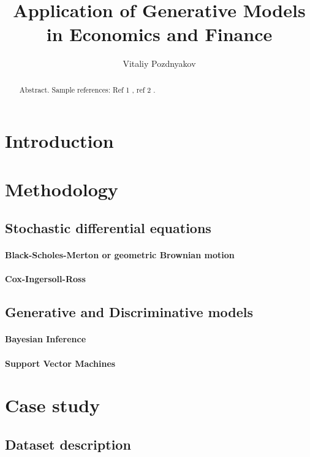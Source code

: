 \documentclass{article}
\title{Application of Generative Models \\ in Economics and Finance}
\author{Vitaliy Pozdnyakov}
\date{}
\begin{document}
\maketitle

\begin{abstract}
    Abstract. Sample references: Ref 1 \cite{renscen}, ref 2 \citet{jebara}.
\end{abstract}

\section{Introduction}

\section{Methodology}

\subsection{Stochastic differential equations}

\paragraph{Black-Scholes-Merton or geometric Brownian motion}
\paragraph{Cox-Ingersoll-Ross}

\subsection{Generative and Discriminative models}

\paragraph{Bayesian Inference}

\paragraph{Support Vector Machines}

\section{Case study}

\subsection{Dataset description}
\end{document}
